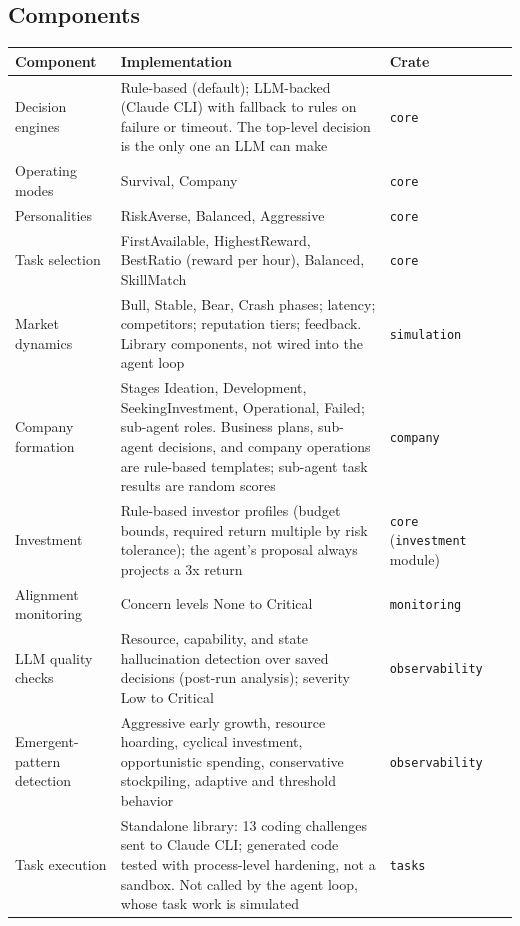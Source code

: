 \documentclass[11pt,letterpaper]{article}
\begin{document}
\subsection{Components}

\begin{center}
\small
\begin{tabularx}{\linewidth}{ZY{0.8}Y{1.56}Y{0.64}}
\toprule
\textbf{Component} & \textbf{Implementation} & \textbf{Crate} \\
\midrule
Decision engines & Rule-based (default); LLM-backed (Claude CLI) with fallback to rules on failure or timeout. The top-level decision is the only one an LLM can make & \texttt{core} \\
Operating modes & Survival, Company & \texttt{core} \\
Personalities & RiskAverse, Balanced, Aggressive & \texttt{core} \\
Task selection & FirstAvailable, HighestReward, BestRatio (reward per hour), Balanced, SkillMatch & \texttt{core} \\
Market dynamics & Bull, Stable, Bear, Crash phases; latency; competitors; reputation tiers; feedback. Library components, not wired into the agent loop & \texttt{simulation} \\
Company formation & Stages Ideation, Development, SeekingInvestment, Operational, Failed; sub-agent roles. Business plans, sub-agent decisions, and company operations are rule-based templates; sub-agent task results are random scores & \texttt{company} \\
Investment & Rule-based investor profiles (budget bounds, required return multiple by risk tolerance); the agent's proposal always projects a 3x return & \texttt{core} (\texttt{investment} module) \\
Alignment monitoring & Concern levels None to Critical & \texttt{monitoring} \\
LLM quality checks & Resource, capability, and state hallucination detection over saved decisions (post-run analysis); severity Low to Critical & \texttt{observability} \\
Emergent-pattern detection & Aggressive early growth, resource hoarding, cyclical investment, opportunistic spending, conservative stockpiling, adaptive and threshold behavior & \texttt{observability} \\
Task execution & Standalone library: 13 coding challenges sent to Claude CLI; generated code tested with process-level hardening, not a sandbox. Not called by the agent loop, whose task work is simulated & \texttt{tasks} \\
\bottomrule
\end{tabularx}
\end{center}
\end{document}
